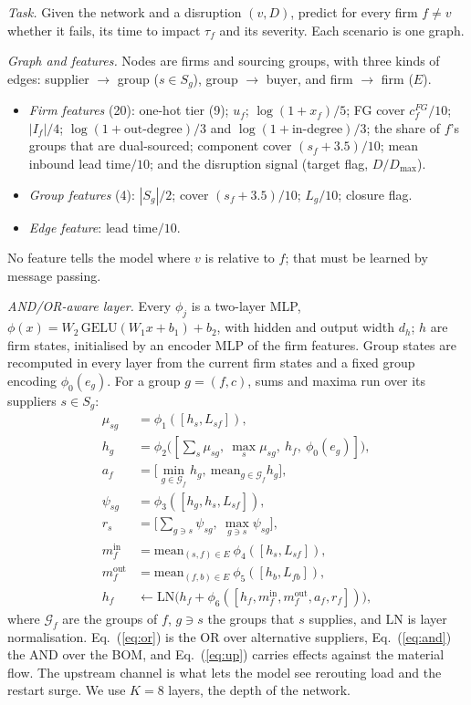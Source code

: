 \documentclass{ifacconf}
\begin{document}
\emph{Task.} Given the network and a disruption $(v,D)$, predict for every firm $f\neq v$ whether it fails, its time to impact $\tau_f$ and its severity. Each scenario is one graph.

\emph{Graph and features.} Nodes are firms and sourcing groups, with three kinds of edges: supplier $\to$ group ($s\in S_g$), group $\to$ buyer, and firm $\to$ firm ($E$).
\begin{itemize}
\item \emph{Firm features} (20): one-hot tier (9); $u_f$; $\log(1+x_f)/5$; FG cover $c^{FG}_f/10$; $|I_f|/4$; $\log(1{+}\text{out-degree})/3$ and $\log(1{+}\text{in-degree})/3$; the share of $f$'s groups that are dual-sourced; component cover $(s_f+3.5)/10$; mean inbound lead time$/10$; and the disruption signal (target flag, $D/D_{\max}$).
\item \emph{Group features} (4): $|S_g|/2$; cover $(s_f+3.5)/10$; $L_g/10$; closure flag.
\item \emph{Edge feature}: lead time$/10$.
\end{itemize}
No feature tells the model where $v$ is relative to $f$; that must be learned by message passing.

\emph{AND/OR-aware layer.} Every $\phi_j$ is a two-layer MLP, $\phi(x)=W_2\,\mathrm{GELU}(W_1x+b_1)+b_2$, with hidden and output width $d_h$; $h$ are firm states, initialised by an encoder MLP of the firm features. Group states are recomputed in every layer from the current firm states and a fixed group encoding $\phi_0(e_g)$. For a group $g=(f,c)$, sums and maxima run over its suppliers $s\in S_g$:
\begin{align}
\mu_{sg}&=\phi_1([h_s,L_{sf}]),\\
h_g&=\phi_2\big([\textstyle\sum_{s}\mu_{sg},\ \max_{s}\mu_{sg},\ h_f,\ \phi_0(e_g)]\big),\label{eq:or}\\
a_f&=\big[\min_{g\in\mathcal{G}_f}h_g,\ \mathrm{mean}_{g\in\mathcal{G}_f}h_g\big],\label{eq:and}\\
\psi_{sg}&=\phi_3([h_g,h_s,L_{sf}]),\\
r_s&=\big[\textstyle\sum_{g\ni s}\psi_{sg},\ \max_{g\ni s}\psi_{sg}\big],\label{eq:up}\\
m^{\mathrm{in}}_f&=\mathrm{mean}_{(s,f)\in E}\ \phi_4([h_s,L_{sf}]),\\
m^{\mathrm{out}}_f&=\mathrm{mean}_{(f,b)\in E}\ \phi_5([h_b,L_{fb}]),\\
h_f&\leftarrow\mathrm{LN}\big(h_f+\phi_6([h_f,m^{\mathrm{in}}_f,m^{\mathrm{out}}_f,a_f,r_f])\big),
\end{align}
where $\mathcal{G}_f$ are the groups of $f$, $g\ni s$ the groups that $s$ supplies, and LN is layer normalisation. Eq.~(\ref{eq:or}) is the OR over alternative suppliers, Eq.~(\ref{eq:and}) the AND over the BOM, and Eq.~(\ref{eq:up}) carries effects against the material flow. The upstream channel is what lets the model see rerouting load and the restart surge. We use $K=8$ layers, the depth of the network.
\end{document}
